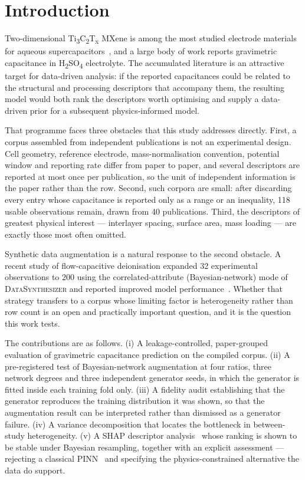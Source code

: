 \section{Introduction}\label{sec:intro}

Two-dimensional Ti\textsubscript{3}C\textsubscript{2}T\textsubscript{x} MXene is among the most
studied electrode materials for aqueous supercapacitors~\cite{naguib2011,ghidiu2014}, and a
large body of work reports
gravimetric capacitance in H\textsubscript{2}SO\textsubscript{4} electrolyte. The
accumulated literature is an attractive target for data-driven analysis: if the reported
capacitances could be related to the structural and processing descriptors that accompany
them, the resulting model would both rank the descriptors worth optimising and supply a
data-driven prior for a subsequent physics-informed model.

That programme faces three obstacles that this study addresses directly. First, a corpus
assembled from independent publications is not an experimental design. Cell geometry,
reference electrode, mass-normalisation convention, potential window and reporting rate
differ from paper to paper, and several descriptors are reported at most once per
publication, so the unit of independent information is the paper rather than the row.
Second, such corpora are small: after discarding every entry whose capacitance is reported
only as a range or an inequality, 118 usable observations remain, drawn from 40
publications. Third, the descriptors of greatest physical interest --- interlayer spacing,
surface area, mass loading --- are exactly those most often omitted.

Synthetic data augmentation is a natural response to the second obstacle. A recent study of
flow-capacitive deionisation expanded 32 experimental observations to 200 using the
correlated-attribute (Bayesian-network) mode of \textsc{DataSynthesizer} and reported
improved model performance~\cite{fcdi_augmentation}. Whether that strategy transfers to a
corpus whose limiting factor is heterogeneity rather than row count is an open and
practically important question, and it is the question this work tests.

The contributions are as follows. (i) A leakage-controlled, paper-grouped evaluation of
gravimetric capacitance prediction on the compiled corpus. (ii) A pre-registered test of
Bayesian-network augmentation at four ratios, three network degrees and three independent
generator seeds, in which the generator is fitted inside each training fold only.
(iii) A fidelity audit establishing that the generator reproduces the training distribution
it was shown, so that the augmentation result can be interpreted rather than dismissed as a
generator failure. (iv) A variance decomposition that locates the bottleneck in
between-study heterogeneity. (v) A SHAP descriptor analysis~\cite{shap2017,treeshap2020} whose ranking is shown to be
stable under Bayesian resampling, together with an explicit assessment --- rejecting a
classical PINN~\cite{pinn2019} and specifying the physics-constrained alternative the data
do support.
